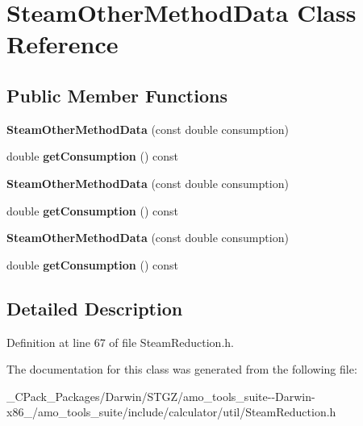 \hypertarget{class_steam_other_method_data}{}\section{Steam\+Other\+Method\+Data Class Reference}
\label{class_steam_other_method_data}
\subsection*{Public Member Functions}
\begin{DoxyCompactItemize}
\item 
\mbox{\label{class_steam_other_method_data_a6f71182013d29119c5c88f0bd2d3a174}} 
{\bfseries Steam\+Other\+Method\+Data} (const double consumption)
\item 
\mbox{\label{class_steam_other_method_data_ae5167a43cf305585dcde4acbe435a87c}} 
double {\bfseries get\+Consumption} () const
\item 
\mbox{\label{class_steam_other_method_data_a6f71182013d29119c5c88f0bd2d3a174}} 
{\bfseries Steam\+Other\+Method\+Data} (const double consumption)
\item 
\mbox{\label{class_steam_other_method_data_ae5167a43cf305585dcde4acbe435a87c}} 
double {\bfseries get\+Consumption} () const
\item 
\mbox{\label{class_steam_other_method_data_a6f71182013d29119c5c88f0bd2d3a174}} 
{\bfseries Steam\+Other\+Method\+Data} (const double consumption)
\item 
\mbox{\label{class_steam_other_method_data_ae5167a43cf305585dcde4acbe435a87c}} 
double {\bfseries get\+Consumption} () const
\end{DoxyCompactItemize}


\subsection{Detailed Description}


Definition at line 67 of file Steam\+Reduction.\+h.



The documentation for this class was generated from the following file\+:\begin{DoxyCompactItemize}
\item 
\+\_\+\+C\+Pack\+\_\+\+Packages/\+Darwin/\+S\+T\+G\+Z/amo\+\_\+tools\+\_\+suite-\/-\/\+Darwin-\/x86\+\_/amo\+\_\+tools\+\_\+suite/include/calculator/util/Steam\+Reduction.\+h\end{DoxyCompactItemize}
